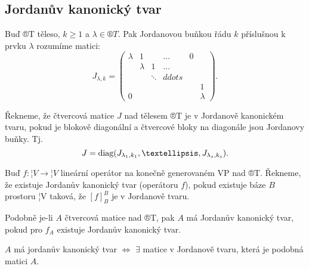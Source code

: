 \documentclass[12pt]{article}                   %
\begin{document}
    \subsection{Jordanův kanonický tvar}
        \begin{definice}
            Buď ®T těleso, $k ≥ 1$ a $\lambda \in ®T$. Pak Jordanovou buňkou řádu $k$ příslušnou k prvku $\lambda$ rozumíme matici:
            $$ J_{\lambda, k} = \begin{pmatrix} \lambda & 1 & & … & 0 \\ & \lambda & 1 & … & \\ & & \ddots & ddots & & \\ & & & & & 1 \\ 0 & & & & & \lambda \end{pmatrix}. $$ 
        \end{definice}

        \begin{definice}
            Řekneme, že čtvercová matice $J$ nad tělesem ®T je v Jordanově kanonickém tvaru, pokud je blokově diagonální a čtvercové bloky na diagonále jsou Jordanovy buňky. Tj.
            $$ J = \diag(J_{\lambda_1, k_1}, …, J_{\lambda_s, k_s}). $$ 
        \end{definice}

        \begin{definice}
            Buď $f: ¦V \rightarrow ¦V$ lineární operátor na konečně generovaném VP nad ®T. Řekneme, že existuje Jordanův kanonický tvar (operátoru $f$), pokud existuje báze $B$ prostoru ¦V taková, že $[f]_B^B$ je v Jordanově tvaru.

            Podobně je-li $A$ čtvercová matice nad ®T, pak $A$ má Jordanův kanonický tvar, pokud pro $f_A$ existuje Jordanův kanonický tvar.
        \end{definice}

        \begin{pozorovani}
            $A$ má jordanův kanonický tvar $\Leftrightarrow$ $\exists$ matice v Jordanově tvaru, která je podobná matici $A$.
        \end{pozorovani}
\end{document}
